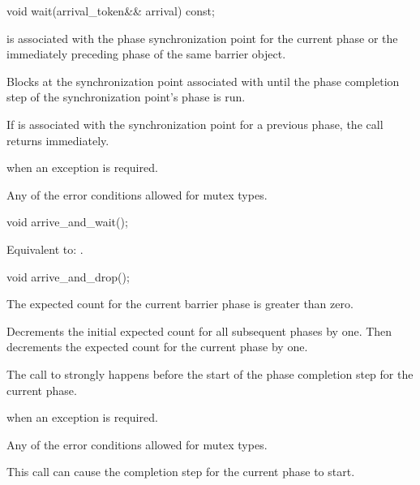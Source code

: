 %
\begin{itemdecl}
void wait(arrival_token&& arrival) const;
\end{itemdecl}

\begin{itemdescr}
\pnum
\expects
{} is associated with
the phase synchronization point for the current phase or
the immediately preceding phase of the same barrier object.

\pnum
{}%
\effects
Blocks at the synchronization point associated with 
until the phase completion step of the synchronization point's phase is run.
\begin{note}
If  is associated with the synchronization point
for a previous phase, the call returns immediately.
\end{note}

\pnum
\throws
{} when an exception is required.

\pnum
\errors
Any of the error conditions
allowed for mutex types.
\end{itemdescr}

%
\begin{itemdecl}
void arrive_and_wait();
\end{itemdecl}

\begin{itemdescr}
\pnum
\effects
Equivalent to: .
\end{itemdescr}

%
\begin{itemdecl}
void arrive_and_drop();
\end{itemdecl}

\begin{itemdescr}
\pnum
\expects
The expected count for the current barrier phase is greater than zero.

\pnum
\effects
Decrements the initial expected count for all subsequent phases by one.
Then decrements the expected count for the current phase by one.

\pnum
\sync
The call to  strongly happens before
the start of the phase completion step for the current phase.

\pnum
\throws
{} when an exception is required.

\pnum
\errors
Any of the error conditions
allowed for mutex types.

\pnum
\begin{note}
This call can cause the completion step for the current phase to start.
\end{note}
\end{itemdescr}

